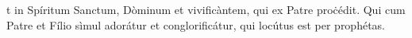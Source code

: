 t in Spíritum Sanctum, Dòminum et vivificàntem, qui ex Patre proċédit. Qui cum Patre et Fílio sìmul adorátur et conglorificátur, qui locútus est per prophétas.
